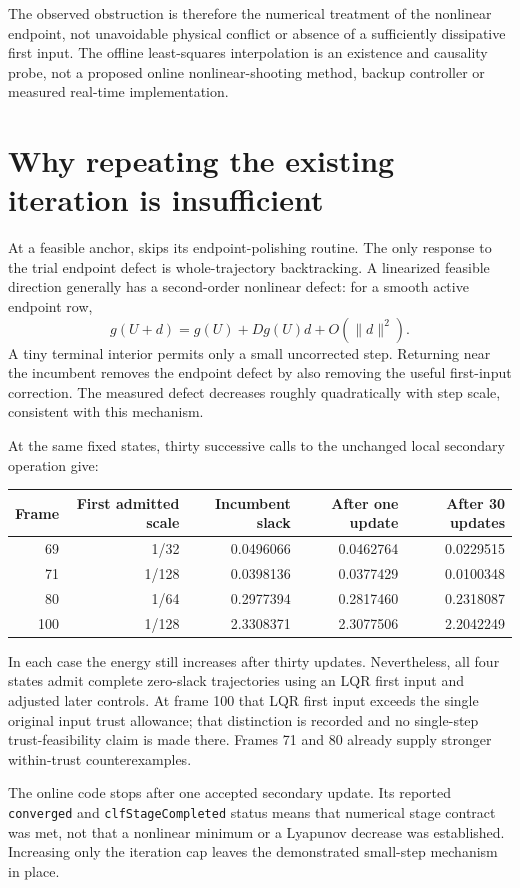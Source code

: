 \documentclass[11pt]{article}
\begin{document}
The observed obstruction is therefore the numerical treatment of the
nonlinear endpoint, not unavoidable physical conflict or absence of a
sufficiently dissipative first input. The offline least-squares interpolation
is an existence and causality probe, not a proposed online nonlinear-shooting
method, backup controller or measured real-time implementation.

\section{Why repeating the existing iteration is insufficient}
At a feasible anchor,  skips its
endpoint-polishing routine. The only response to the trial endpoint defect
is whole-trajectory backtracking. A linearized feasible direction generally
has a second-order nonlinear defect: for a smooth active endpoint row,
\[
g(U+d)=g(U)+Dg(U)d+O(\|d\|^2).
\]
A tiny terminal interior permits only a small uncorrected step. Returning
near the incumbent removes the endpoint defect by also removing the useful
first-input correction. The measured defect decreases roughly quadratically
with step scale, consistent with this mechanism.

At the same fixed states, thirty successive calls to the unchanged local
secondary operation give:
\begin{center}
\begin{tabular}{rrrrr}
\toprule
Frame&First admitted scale&Incumbent slack&After one update&After 30 updates\\
\midrule
69&1/32&0.0496066&0.0462764&0.0229515\\
71&1/128&0.0398136&0.0377429&0.0100348\\
80&1/64&0.2977394&0.2817460&0.2318087\\
100&1/128&2.3308371&2.3077506&2.2042249\\
\bottomrule
\end{tabular}
\end{center}
In each case the energy still increases after thirty updates. Nevertheless,
all four states admit complete zero-slack trajectories using an LQR first
input and adjusted later controls. At frame 100 that LQR first input exceeds
the single original input trust allowance; that distinction is recorded and
no single-step trust-feasibility claim is made there. Frames 71 and 80 already
supply stronger within-trust counterexamples.

The online code stops after one accepted secondary update. Its reported
\texttt{converged} and \texttt{clfStageCompleted} status means that numerical
stage contract was met, not that a nonlinear minimum or a Lyapunov decrease
was established. Increasing only the iteration cap leaves the demonstrated
small-step mechanism in place.
\end{document}
